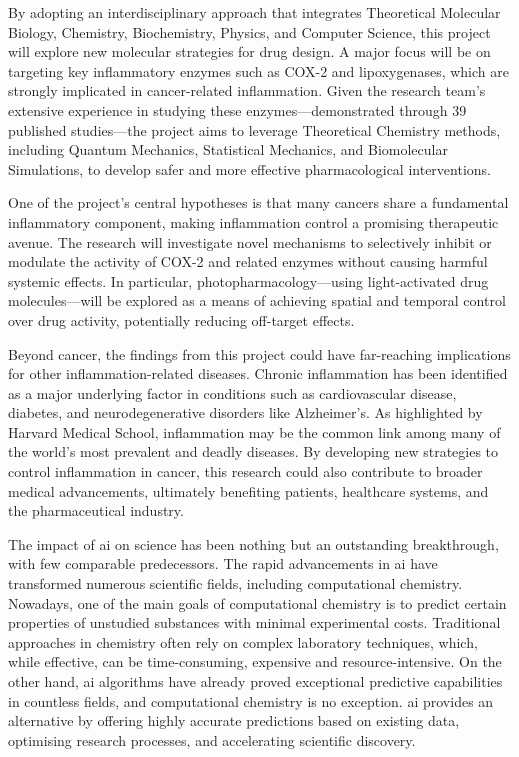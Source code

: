 \documentclass[11pt]{article}
\begin{document}
By adopting an interdisciplinary approach that integrates Theoretical Molecular Biology, Chemistry, Biochemistry, Physics, and Computer Science, this project will explore new molecular strategies for drug design. A major focus will be on targeting key inflammatory enzymes such as COX-2 and lipoxygenases, which are strongly implicated in cancer-related inflammation. Given the research team’s extensive experience in studying these enzymes—demonstrated through 39 published studies—the project aims to leverage Theoretical Chemistry methods, including Quantum Mechanics, Statistical Mechanics, and Biomolecular Simulations, to develop safer and more effective pharmacological interventions.

One of the project’s central hypotheses is that many cancers share a fundamental inflammatory component, making inflammation control a promising therapeutic avenue. The research will investigate novel mechanisms to selectively inhibit or modulate the activity of COX-2 and related enzymes without causing harmful systemic effects. In particular, photopharmacology—using light-activated drug molecules—will be explored as a means of achieving spatial and temporal control over drug activity, potentially reducing off-target effects.

Beyond cancer, the findings from this project could have far-reaching implications for other inflammation-related diseases. Chronic inflammation has been identified as a major underlying factor in conditions such as cardiovascular disease, diabetes, and neurodegenerative disorders like Alzheimer’s. As highlighted by Harvard Medical School, inflammation may be the common link among many of the world’s most prevalent and deadly diseases. By developing new strategies to control inflammation in cancer, this research could also contribute to broader medical advancements, ultimately benefiting patients, healthcare systems, and the pharmaceutical industry.

\noindent\makebox[\linewidth]{\rule{\paperwidth}{0.4pt}}


The impact of \gls{ai} on science has been nothing but an outstanding breakthrough, with few comparable predecessors. The rapid advancements in \gls{ai} have transformed numerous scientific fields\cite{AlphaFold2BiologyAndMedicine}\cite{NationalLibraryOfMedicineGeneralArticle}, including computational chemistry. Nowadays, one of the main goals of computational chemistry is to predict certain properties of unstudied substances with minimal experimental costs\cite{AlphaFold2CommumityAssesment}. Traditional approaches in chemistry often rely on complex laboratory techniques, which, while effective, can be time-consuming, expensive and resource-intensive. On the other hand, \gls{ai} algorithms have already proved exceptional predictive capabilities in countless fields, and computational chemistry is no exception. \gls{ai} provides an alternative by offering highly accurate predictions based on existing data, optimising research processes, and accelerating scientific discovery.\par
\end{document}

